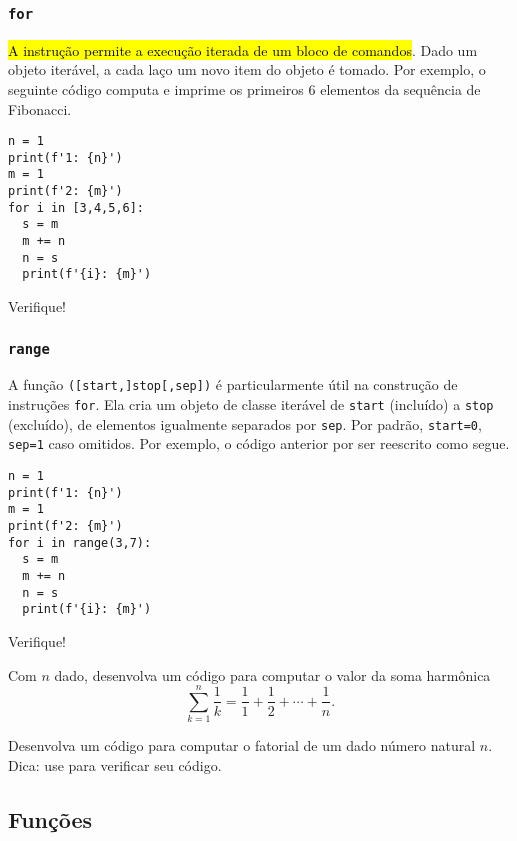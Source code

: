 \documentclass[12pt]{article}
\begin{document}
\subsubsection{\texttt{for}}

\hl{A instrução {\PYTHONfor} permite a execução iterada de um bloco de comandos}. Dado um objeto iterável, a cada laço um novo item do objeto é tomado. Por exemplo, o seguinte código computa e imprime os primeiros $6$ elementos da sequência de Fibonacci.

\begin{lstlisting}
n = 1
print(f'1: {n}')
m = 1
print(f'2: {m}')
for i in [3,4,5,6]:
  s = m
  m += n
  n = s
  print(f'{i}: {m}')
\end{lstlisting}

Verifique!

\subsubsection{\texttt{range}}

A função {\PYTHONrange}\texttt{([start,]stop[,sep])} é particularmente útil na construção de instruções \texttt{for}. Ela cria um objeto de classe iterável de \texttt{start} (incluído) a \texttt{stop} (excluído), de elementos igualmente separados por \texttt{sep}. Por padrão, \texttt{start=0}, \texttt{sep=1} caso omitidos. Por exemplo, o código anterior por ser reescrito como segue.

\begin{lstlisting}
n = 1
print(f'1: {n}')
m = 1
print(f'2: {m}')
for i in range(3,7):
  s = m
  m += n
  n = s
  print(f'{i}: {m}')
\end{lstlisting}

Verifique!

\begin{exr}
  Com $n$ dado, desenvolva um código para computar o valor da soma harmônica
  \begin{equation}
    \sum_{k=1}^n \frac{1}{k} = \frac{1}{1} + \frac{1}{2} + \cdots + \frac{1}{n}.
  \end{equation}
\end{exr}

\begin{exr}
  Desenvolva um código para computar o fatorial de um dado número natural $n$. Dica: use {\PYTHONmathDOTfactorial} para verificar seu código.
\end{exr}

\subsection{Funções}
\end{document}
